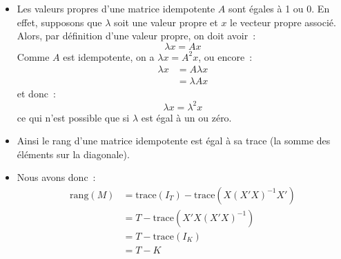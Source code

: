 \documentclass[10pt]{beamer}
\begin{document}
\begin{notes}

  \begin{itemize}

  \item Les valeurs propres d'une matrice idempotente $A$ sont égales à 1 ou 0. En effet, supposons que $\lambda$ soit une valeur propre et $x$ le vecteur propre associé. Alors, par définition d'une valeur propre, on doit avoir~:
    \[
      \lambda x = A x
    \]
    Comme $A$ est idempotente, on a $\lambda x = A^2 x$, ou encore~:
    \[
      \begin{split}
        \lambda x &= A \lambda x\\
        &= \lambda A x
      \end{split}
    \]
    et donc~:
    \[
      \lambda x = \lambda^2 x
    \]
    ce qui n'est possible que si $\lambda$ est égal à un ou zéro.\newline

  \item Ainsi le rang d'une matrice idempotente est égal à sa trace (la somme des éléments sur la diagonale).\newline

  \item Nous avons donc~:
    \[
      \begin{split}
        \mathrm{rang}(M) &= \mathrm{trace}(I_T) - \mathrm{trace}\left( X(X'X)^{-1}X' \right)\\
                         &= T - \mathrm{trace}\left( X'X(X'X)^{-1} \right)\\
                         &= T - \mathrm{trace}\left(I_K\right)\\
        &= T-K
      \end{split}
  \]
  \end{itemize}

\end{notes}
\end{document}

